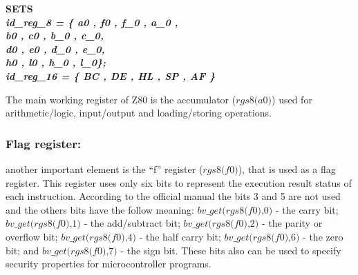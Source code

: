 \documentclass[a4paper]{llncs}
\begin{document}
\begin{sloppypar}

	\bf SETS\\
	\hspace*{0.10in}\it id\_reg\_8 \rm = \rm \{ \it a0 \rm , \it f0 \rm , \it f\_0 \rm , \it a\_0 \rm ,\\
	\hspace*{0.93in}\it b0 \rm , \it c0 \rm , \it b\_0 \rm , \it c\_0\rm,\\
	\hspace*{0.93in}\it d0 \rm , \it e0 \rm , \it d\_0 \rm , \it e\_0\rm,\\
	\hspace*{0.93in}\it h0 \rm , \it l0 \rm , \it h\_0 \rm , \it l\_0\};\\
	\hspace*{0.10in}\it id\_reg\_16 \rm = \rm \{ \it BC \rm , \it DE \rm , \it HL \rm , \it SP \rm , \it AF \rm \}
	

\end{sloppypar}

The main working register of Z80 is the accumulator ($\textit{rgs8(a0)}$) used for arithmetic/logic,
input/output and loading/storing operations.

\subsubsection{Flag register:}
another important element is the ``f'' register ($\textit{rgs8(f0)}$),  that is
used as a flag register. This register uses only six bits to represent the execution result status of each instruction.
According to the official manual the bits 3 and 5 are not used and the others bits have the follow meaning: $\textit{bv\_get(rgs8(f0),0)}$ - the carry bit; $\textit{bv\_get(rgs8(f0),1)}$ - the add/subtract bit; $\textit{bv\_get(rgs8(f0),2)}$ - the parity or overflow bit; $\textit{bv\_get(rgs8(f0),4)}$ - the half carry bit; 
$\textit{bv\_get(rgs8(f0),6)}$ - the zero bit; and $\textit{bv\_get(rgs8(f0),7)}$ - the sign bit.
These bits also can be used to specify security properties for microcontroller programs.   
\end{document}
